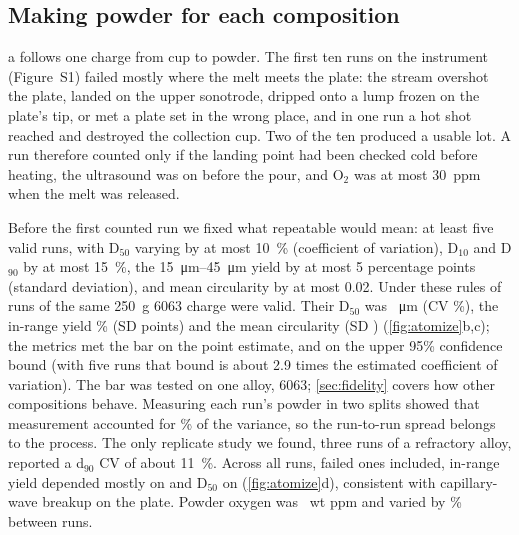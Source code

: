 \documentclass[11pt]{article}
\begin{document}
\subsection{Making powder for each composition}
\label{sec:atomize}

a follows one charge from cup to powder. The first ten runs on
the instrument (Figure~S1)
failed mostly where the melt meets the plate: the stream overshot the plate,
landed on the upper sonotrode, dripped onto a lump frozen on the plate's tip, or
met a plate set in the wrong place, and in one run a hot shot reached and
destroyed the collection cup. Two of the ten produced a usable lot. A run
therefore counted only if the landing point had been checked cold before
heating, the ultrasound was on before the pour, and O$_2$ was at most
\SI{30}{ppm} when the melt was released.

Before the first counted run we fixed what repeatable would mean: at least five
valid runs, with D$_{50}$ varying by at most \SI{10}{\percent} (coefficient of
variation), D$_{10}$ and D$_{90}$ by at most \SI{15}{\percent}, the
\SIrange{15}{45}{\micro\metre} yield by at most 5 percentage points (standard
deviation), and mean circularity by at most 0.02. Under these rules
 of  runs of the same
\SI{250}{\gram} 6063 charge were valid. Their D$_{50}$ was ~\si{\micro\metre}
(CV \%), the in-range yield \% (SD  points) and the mean
circularity  (SD ) (\cref{fig:atomize}b,c);
 the metrics met the bar on the point estimate, and 
on the upper 95\% confidence bound (with five runs that bound is about 2.9 times
the estimated coefficient of variation). The bar was tested on one alloy, 6063;
\cref{sec:fidelity} covers how other compositions behave. Measuring each run's powder in two
splits showed that measurement accounted for \% of the variance, so the
run-to-run spread belongs to the process. The only replicate study we found, three
runs of a refractory alloy, reported a d$_{90}$ CV of about
\SI{11}{\percent}.\cite{hinrichs2021} Across all  runs, failed ones
included, in-range yield depended mostly on 
and D$_{50}$ on  (\cref{fig:atomize}d), consistent
with capillary-wave breakup on the plate.\cite{lierke1967,lang1962,priyadarshi2024}
Powder oxygen was ~wt ppm and varied by \% between runs.
\end{document}
